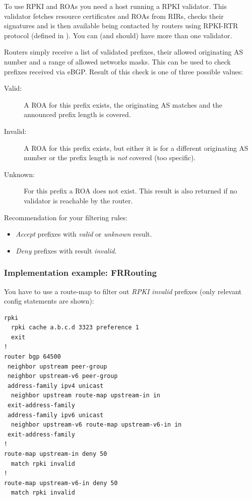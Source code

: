 To use RPKI and ROAs you need a host running a \gls{RPKI validator}. This validator fetches resource certificates and \glspl{ROA} from \glspl{RIR}, checks their signatures and is then available being contacted by routers using RPKI-RTR protocol (defined in ). You can (and should) have more than one validator.

 Routers simply receive a list of validated prefixes, their allowed originating AS number and a range of allowed networks masks. This can be used to check prefixes received via eBGP. Result of this check is one of three possible values:
 \begin{description}
   \item[Valid:] A \gls{ROA} for this prefix exists, the originating AS matches and the announced prefix length is covered.
   \item[Invalid:] A ROA for this prefix exists, but either it is for a different originating AS number or the prefix length is \emph{not} covered (too specific).
   \item[Unknown:] For this prefix a ROA does not exist. This result is also returned if no validator is reachable by the router.
 \end{description}

Recommendation for your filtering rules:
\begin{itemize}
  \item \emph{Accept} prefixes with \emph{valid} or \emph{unknown} result.
  \item \emph{Deny} prefixes with result \emph{invalid}.
\end{itemize}

\subsubsection{Implementation example: FRRouting}
You have to use a route-map to filter out \emph{RPKI invalid} prefixes (only relevant config statements are shown):
\begin{verbatim}
rpki
  rpki cache a.b.c.d 3323 preference 1
  exit
!
router bgp 64500
 neighbor upstream peer-group
 neighbor upstream-v6 peer-group
 address-family ipv4 unicast
  neighbor upstream route-map upstream-in in
 exit-address-family
 address-family ipv6 unicast
  neighbor upstream-v6 route-map upstream-v6-in in
 exit-address-family
!
route-map upstream-in deny 50
  match rpki invalid
!
route-map upstream-v6-in deny 50
  match rpki invalid
\end{verbatim}

